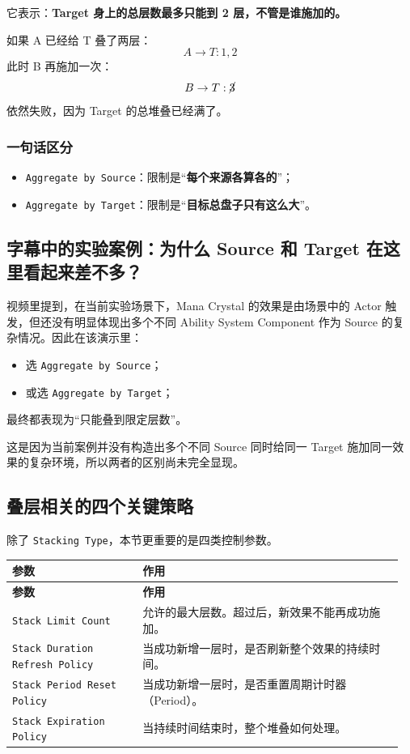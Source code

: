 它表示：\textbf{Target 身上的总层数最多只能到 2 层，不管是谁施加的。}

如果 A 已经给 T 叠了两层：
\[
A \to T: 1, 2
\]
此时 B 再施加一次：
\[
B \to T: \cancel{3}
\]
依然失败，因为 Target 的总堆叠已经满了。

\subsubsection{一句话区分}

\begin{itemize}
	\item \texttt{Aggregate by Source}：限制是“\textbf{每个来源各算各的}”；
	\item \texttt{Aggregate by Target}：限制是“\textbf{目标总盘子只有这么大}”。
\end{itemize}

\subsection{字幕中的实验案例：为什么 Source 和 Target 在这里看起来差不多？}

视频里提到，在当前实验场景下，Mana Crystal 的效果是由场景中的 Actor 触发，但还没有明显体现出多个不同 Ability System Component 作为 Source 的复杂情况。因此在该演示里：

\begin{itemize}
	\item 选 \texttt{Aggregate by Source}；
	\item 或选 \texttt{Aggregate by Target}；
\end{itemize}

最终都表现为“只能叠到限定层数”。

这是因为当前案例并没有构造出多个不同 Source 同时给同一 Target 施加同一效果的复杂环境，所以两者的区别尚未完全显现。

\subsection{叠层相关的四个关键策略}

除了 \texttt{Stacking Type}，本节更重要的是四类控制参数。

\begin{longtable}{p{0.32\linewidth}|p{0.64\linewidth}}
	\toprule
	\textbf{参数} & \textbf{作用}\\
	\midrule
	\endfirsthead
	\toprule
	\textbf{参数} & \textbf{作用}\\
	\midrule
	\endhead
	\texttt{Stack Limit Count} &
	允许的最大层数。超过后，新效果不能再成功施加。\\
	\texttt{Stack Duration Refresh Policy} &
	当成功新增一层时，是否刷新整个效果的持续时间。\\
	\texttt{Stack Period Reset Policy} &
	当成功新增一层时，是否重置周期计时器（Period）。\\
	\texttt{Stack Expiration Policy} &
	当持续时间结束时，整个堆叠如何处理。\\
	\bottomrule
\end{longtable}

